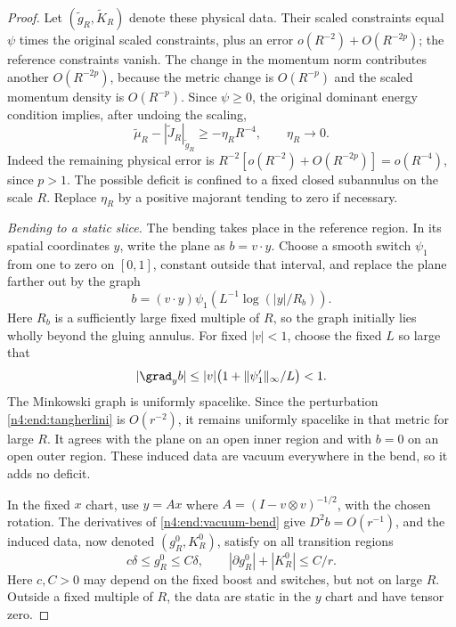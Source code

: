 \begin{proof}
Let \((\widetilde g_R,\widetilde K_R)\) denote these physical data.
Their scaled constraints equal \(\psi\) times the original scaled
constraints, plus an error
\(o(R^{-2})+O(R^{-2p})\); the reference constraints vanish.
The change in the momentum norm contributes another \(O(R^{-2p})\), because
the metric change is \(O(R^{-p})\) and the scaled momentum density is
\(O(R^{-p})\). Since \(\psi\ge0\), the original dominant energy
condition implies, after undoing the scaling,
\begin{equation}\label{n4:end:physical-deficit}
 \widetilde\mu_R-|\widetilde J_R|_{\widetilde g_R}
       \ge-\eta_RR^{-4},\qquad \eta_R\longrightarrow0.
\end{equation}
Indeed the remaining physical error is
\(R^{-2}[o(R^{-2})+O(R^{-2p})]=o(R^{-4})\), since \(p>1\).
The possible deficit is confined to a fixed closed subannulus on the
scale \(R\). Replace \(\eta_R\) by a positive majorant tending to zero
if necessary.

\smallskip
\noindent\emph{Bending to a static slice.} The bending takes place in the reference region. In its spatial
coordinates \(y\), write the plane as \(b=v\cdot y\). Choose a smooth
switch \(\psi_1\) from one to zero on \([0,1]\), constant outside that
interval, and replace the plane farther out by the graph
\begin{equation}\label{n4:end:vacuum-bend}
 b=(v\cdot y)\psi_1\left(L^{-1}\log(|y|/R_b)\right).
\end{equation}
Here \(R_b\) is a sufficiently large fixed multiple of \(R\), so the
graph initially lies wholly beyond the gluing annulus. For fixed
\(|v|<1\), choose the fixed \(L\) so large that
\[
 |\grad_y b|
 \le |v|\bigl(1+\|\psi_1'\|_\infty/L\bigr)<1.
\]
The Minkowski graph is uniformly spacelike. Since the perturbation
\eqref{n4:end:tangherlini} is \(O(r^{-2})\), it remains uniformly spacelike
in that metric for large \(R\). It agrees with the plane on an open
inner region and with \(b=0\) on an open outer region. These induced
data are vacuum everywhere in the bend, so it adds no deficit.

In the fixed \(x\) chart, use \(y=Ax\) where
\(A=(I-v\otimes v)^{-1/2}\), with the chosen rotation. The derivatives
of \eqref{n4:end:vacuum-bend} give \(D^2b=O(r^{-1})\), and the induced
data, now denoted \((g_R^0,K_R^0)\), satisfy on all transition regions
\begin{equation}\label{n4:end:transition-geometry}
 c\delta\le g_R^0\le C\delta,\qquad
 |\partial g_R^0|+|K_R^0|\le C/r.
\end{equation}
Here \(c,C>0\) may depend on the fixed boost and switches, but not
on large \(R\). Outside a fixed multiple of \(R\), the data are static
in the \(y\) chart and have tensor zero.


\end{proof}
